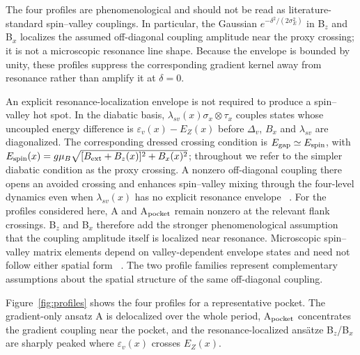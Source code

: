 \documentclass[aip,jap,reprint,superscriptaddress,longbibliography,floatfix]{revtex4-2}
\begin{document}
The four profiles are phenomenological and should not be read as
literature-standard spin--valley couplings. In particular, the Gaussian
$e^{-\delta^2/(2\sigma_E^2)}$ in B$_z$ and B$_x$ localizes the assumed
off-diagonal coupling amplitude near the proxy crossing; it is not a
microscopic resonance line shape. Because the envelope is bounded by unity,
these profiles suppress the corresponding gradient kernel away from resonance
rather than amplify it at $\delta=0$.

An explicit resonance-localization envelope is not required to produce a
spin--valley hot spot. In the diabatic basis,
$\lambda_{sv}(x)\sigma_x\otimes\tau_x$ couples states whose uncoupled energy
difference is $\varepsilon_v(x)-E_Z(x)$ before $\Delta_v$, $B_x$ and
$\lambda_{sv}$ are diagonalized. The corresponding dressed crossing condition
is $E_{\rm gap}\simeq E_{\rm spin}$, with
$E_{\rm spin}(x)=g\mu_B\sqrt{[B_{\rm ext}+B_z(x)]^2+B_x(x)^2}$; throughout we
refer to the simpler diabatic condition as the proxy crossing. A nonzero
off-diagonal coupling there opens an avoided crossing and enhances
spin--valley mixing through the four-level dynamics even when
$\lambda_{sv}(x)$ has no explicit resonance envelope
~\cite{yang_spin-valley_2013,huang_spin_2014}. For the profiles considered
here, A and A$_{\rm pocket}$ remain nonzero at the relevant flank crossings.
B$_z$ and B$_x$ therefore add the
stronger phenomenological assumption that the coupling amplitude itself is
localized near resonance. Microscopic spin--valley matrix elements depend on
valley-dependent envelope states and need not follow either spatial form
~\cite{hosseinkhani_theory_2022,huang_spin_2014}. The two profile families
represent complementary assumptions about the spatial structure of the same
off-diagonal coupling.

Figure~\ref{fig:profiles} shows the four profiles for a representative
pocket. The gradient-only ansatz A is delocalized over the whole period,
A$_{\rm pocket}$ concentrates the gradient coupling near the pocket, and the
resonance-localized ans\"atze B$_z$/B$_x$ are sharply peaked where
$\varepsilon_v(x)$ crosses $E_Z(x)$.
\end{document}
